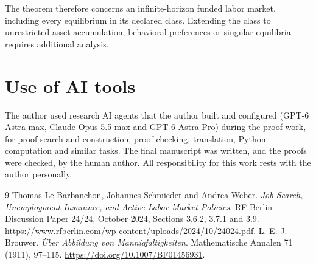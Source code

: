 \documentclass[11pt]{article}
\begin{document}
The theorem therefore concerns an infinite-horizon funded labor market, including every equilibrium in its declared class. Extending the class to unrestricted asset accumulation, behavioral preferences or singular equilibria requires additional analysis.

\section*{Use of AI tools}
The author used research AI agents that the author built and configured (GPT-6 Astra max,
Claude Opus 5.5 max and GPT-6 Astra Pro) during the proof work, for proof search and
construction, proof checking, translation, Python computation and similar tasks. The final
manuscript was written, and the proofs were checked, by the human author. All responsibility
for this work rests with the author personally.

\begin{thebibliography}{9}
 Thomas Le Barbanchon, Johannes Schmieder and Andrea Weber.
\emph{Job Search, Unemployment Insurance, and Active Labor Market Policies}.
RF Berlin Discussion Paper 24/24, October 2024, Sections 3.6.2, 3.7.1 and 3.9.
\url{https://www.rfberlin.com/wp-content/uploads/2024/10/24024.pdf}.
 L. E. J. Brouwer.
\emph{\"Uber Abbildung von Mannigfaltigkeiten}.
Mathematische Annalen 71 (1911), 97--115.
\url{https://doi.org/10.1007/BF01456931}.
\end{thebibliography}
\end{document}

